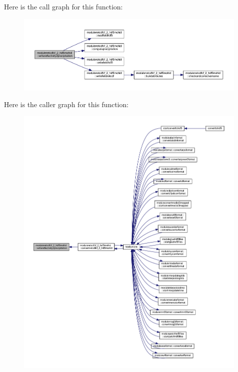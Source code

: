 Here is the call graph for this function\+:\nopagebreak
\begin{figure}[H]
\begin{center}
\leavevmode
\includegraphics[width=350pt]{namespacemodulenetcdfcf__2__hdf5mohid_a349ec5caaf89753f5f078da13ba6a247_cgraph}
\end{center}
\end{figure}
Here is the caller graph for this function\+:\nopagebreak
\begin{figure}[H]
\begin{center}
\leavevmode
\includegraphics[width=350pt]{namespacemodulenetcdfcf__2__hdf5mohid_a349ec5caaf89753f5f078da13ba6a247_icgraph}
\end{center}
\end{figure}
\mbox{\label{namespacemodulenetcdfcf__2__hdf5mohid_a2137023763cf82253ee1d5e868541499}} 
